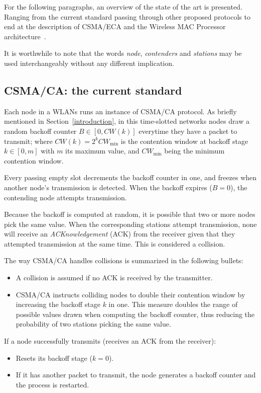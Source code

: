 For the following paragraphs, an overview of the state of the art is presented. Ranging from the current standard passing through other proposed protocols to end at the description of CSMA/ECA and the Wireless MAC Processor architecture~\cite{WMP}.

It is worthwhile to note that the words \emph{node}, \emph{contenders} and \emph{stations} may be used interchangeably without any different implication.

\subsection{CSMA/CA: the current standard}
Each node in a WLANs runs an instance of CSMA/CA protocol. As briefly mentioned in Section~\ref{introduction}, in this time-slotted networks nodes draw a random backoff counter $B\in[0,CW(k)]$ everytime they have a packet to transmit; where $CW(k)=2^{k}CW_{\min}$ is the contention window at backoff stage $k\in[0,m]$ with $m$ its maximum value, and $CW_{\min}$ being the minimum contention window.

Every passing empty slot decrements the backoff counter in one, and freezes when another node's transmission is detected. When the backoff expires ($B=0$), the contending node attempts transmission.

Because the backoff is computed at random, it is possible that two or more nodes pick the same value. When the corresponding stations attempt transmission, none will receive an \emph{ACKnowledgement} (ACK) from the receiver given that they attempted transmission at the same time. This is considered a collision.

The way CSMA/CA handles collisions is summarized in the following bullets:
\begin{itemize}
	\item A collision is assumed if no ACK is received by the transmitter.
	\item CSMA/CA instructs colliding nodes to double their contention window by increasing the backoff stage $k$ in one. This measure doubles the range of possible values drawn when computing the backoff counter, thus reducing the probability of two stations picking the same value.
\end{itemize}

If a node successfully transmits (receives an ACK from the receiver):
\begin{itemize}
	\item Resets its backoff stage ($k=0$).
	\item If it has another packet to transmit, the node generates a backoff counter and the process is restarted.
\end{itemize}

